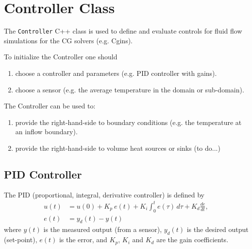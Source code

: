 \section{Controller Class} \label{sec:ControllerClass}

The {\tt Controller} C++  class is used to define and evaluate controls for fluid flow simulations for the
CG solvers (e.g. Cgins).

To initialize the Controller one should
\begin{enumerate}
  \item choose a controller and parameters (e.g. PID controller with gains).
  \item choose a sensor (e.g. the average temperature in the domain or sub-domain).
\end{enumerate}
The Controller can be used to:
\begin{enumerate}
   \item provide the right-hand-side to boundary conditions (e.g. the temperature at an inflow boundary).
   \item provide the right-hand-side to volume heat sources or sinks (to do...)
\end{enumerate}


\newcommand{\uSensor}{u_{\rm sensor}}
\subsection{PID Controller} \label{sec:PIDcontroller}


The PID (proportional, integral, derivative controller) is defined by
\begin{align}
   u(t) &= u(0) + K_p~e(t)  +  K_i \int_0^t  e(\tau)  \,d\tau  + K_d \frac{d e}{dt},   \label{eq:PIDcontroller} \\
   e(t) &= y_d(t) - y(t)
\end{align}
where $y(t)$ is the measured output (from a sensor), $y_d(t)$ is the desired output (set-point), 
$e(t)$ is the error, and $K_p$, $K_i$ and $K_d$ are the gain coefficients.

